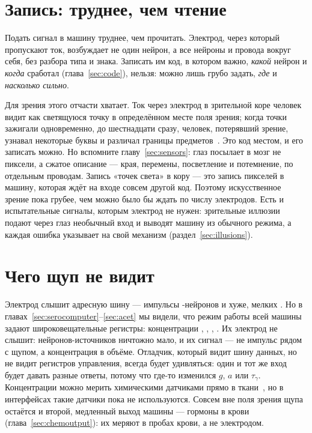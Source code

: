\section{Запись: труднее, чем чтение}

Подать сигнал в машину труднее, чем прочитать. Электрод, через который пропускают ток, возбуждает не один нейрон, а все нейроны и провода вокруг себя, без разбора типа и знака. Записать им код, в котором важно, \emph{какой} нейрон и \emph{когда} сработал (глава~\ref{sec:code}), нельзя: можно лишь грубо задать, \emph{где} и \emph{насколько сильно}.

Для зрения этого отчасти хватает. Ток через электрод в зрительной коре человек видит как светящуюся точку в определённом месте поля зрения; когда точки зажигали одновременно, до шестнадцати сразу, человек, потерявший зрение, узнавал некоторые буквы и различал границы предметов~\cite{Fernandez2021}. Это код местом, и его записать можно. Но вспомните главу~\ref{sec:sensors}: глаз посылает в мозг не пиксели, а сжатое описание --- края, перемены, посветление и потемнение, по отдельным проводам. Запись «точек света» в кору --- это запись пикселей в машину, которая ждёт на входе совсем другой код. Поэтому искусственное зрение пока грубее, чем можно было бы ждать по числу электродов. Есть и испытательные сигналы, которым электрод не нужен: зрительные иллюзии подают через глаз необычный вход и выводят машину из обычного режима, а каждая ошибка указывает на свой механизм (раздел~\ref{sec:illusions}).

\section{Чего щуп не видит}

Электрод слышит адресную шину --- импульсы -нейронов и хуже, мелких . Но в главах~\ref{sec:serocomputer}--\ref{sec:acet} мы видели, что режим работы всей машины задают широковещательные регистры: концентрации , , , . Их электрод не слышит: нейронов-источников ничтожно мало, и их сигнал --- не импульс рядом с щупом, а концентрация в объёме. Отладчик, который видит шину данных, но не видит регистров управления, всегда будет удивляться: один и тот же вход будет давать разные ответы, потому что где-то изменился $g$, $a$ или $\tau_\gamma$. Концентрации можно мерить химическими датчиками прямо в ткани~\cite{Bunin1998}, но в интерфейсах такие датчики пока не используются. Совсем вне поля зрения щупа остаётся и второй, медленный выход машины --- гормоны в крови (глава~\ref{sec:chemoutput}): их меряют в пробах крови, а не электродом.

